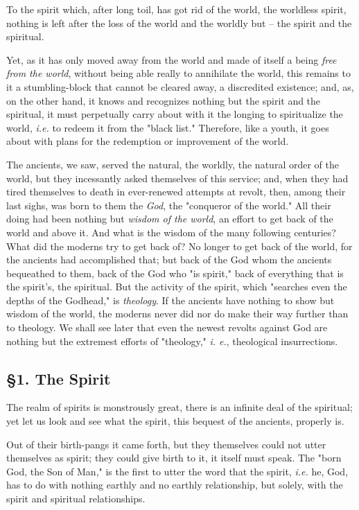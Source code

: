 To the spirit which, after long toil, has got rid of the world, the worldless 
spirit, nothing is left after the loss of the world and the worldly but -- the 
spirit and the spiritual.

Yet, as it has only moved away from the world and made of itself a being 
\textit{free from the world}, without being able really to annihilate the 
world, this remains to it a stumbling-block that cannot be cleared away, a 
discredited existence; and, as, on the other hand, it knows and recognizes 
nothing but the spirit and the spiritual, it must perpetually carry about with 
it the longing to spiritualize the world, \textit{i.e.} to redeem it from the 
"{}black list."{} Therefore, like a youth, it goes about with plans for the 
redemption or improvement of the world.

The ancients, we saw, served the natural, the worldly, the natural order of 
the world, but they incessantly asked themselves of this service; and, when 
they had tired themselves to death in ever-renewed attempts at revolt, then, 
among their last sighs, was born to them the \textit{God}, the "{}conqueror of 
the world."{} All their doing had been nothing but \textit{wisdom of the 
world}, an effort to get back of the world and above it. And what is the 
wisdom of the many following centuries? What did the moderns try to get back 
of? No longer to get back of the world, for the ancients had accomplished 
that; but back of the God whom the ancients bequeathed to them, back of the 
God who "{}is spirit,"{} back of everything that is the spirit's, the 
spiritual. But the activity of the spirit, which "{}searches even the depths 
of the Godhead,"{} is \textit{theology}. If the ancients have nothing to show 
but wisdom of the world, the moderns never did nor do make their way further 
than to theology. We shall see later that even the newest revolts against God 
are nothing but the extremest efforts of "{}theology,"{} \textit{i. e.}, 
theological insurrections.

\subsection[\S{}1. The Spirit]{\centering \S{}1. The Spirit}

The realm of spirits is monstrously great, there is an infinite deal of the 
spiritual; yet let us look and see what the spirit, this bequest of the 
ancients, properly is.

Out of their birth-pangs it came forth, but they themselves could not utter 
themselves as spirit; they could give birth to it, it itself must speak. The 
"{}born God, the Son of Man,"{} is the first to utter the word that the 
spirit, \textit{i.e.} he, God, has to do with nothing earthly and no earthly 
relationship, but solely, with the spirit and spiritual relationships.

